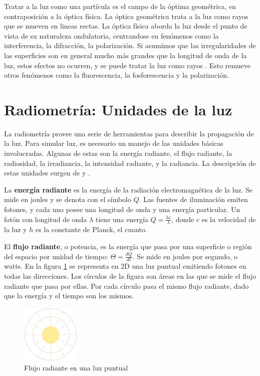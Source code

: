 Tratar a la luz como una partícula es el campo de la óptima geométrica, en contraposición a la óptica física.
La óptica geométrica trata a la luz como rayos que se mueven en lineas rectas.
La óptica física aborda la luz desde el punto de vista de su naturaleza ondulatoria, centrandose en fenómenos como la interferencia, la difracción, la polarización.
Si asumimos que las irregularidades de las superficies son en general mucho más grandes que la longitud de onda de la luz, estos efectos no ocurren, y se puede tratar la luz como rayos \cite{rtr}.
Esto remueve otros fenómenos como la fluorescencia, la fosforescencia y la polarización.


\section{Radiometría: Unidades de la luz}\label{sec:radiometry}

La radiometría provee una serie de herramientas para describir la propagación de la luz.
Para simular luz, es necesario un manejo de las unidades básicas involucradas.
Algunas de estas son la energía radiante, el flujo radiante, la radiosidad, la irradiancia, la intensidad radiante, y la radiancia.
La descripción de estas unidades surgen de \cite{rtr} y \cite{pbr}.

La \textbf{energía radiante} es la energía de la radiación electromagnética de la luz.
Se mide en joules y se denota con el símbolo $Q$.
Las fuentes de iluminación emiten fotones, y cada uno posee una longitud de onda y una energía particular.
Un fotón con longitud de onda $\lambda$ tiene una energía $Q = \frac{hc}{\lambda}$, donde $c$ es la velocidad de la luz y $h$ es la constante de Planck, el cuanto.

El \textbf{flujo radiante}, o potencia, es la energía que pasa por una superficie o región del espacio por unidad de tiempo: $\Theta = \frac{dQ}{dt}$.
Se mide en joules por segundo, o watts.
En la figura \ref{fig:point-light-flux} se representa en 2D una luz puntual emitiendo fotones en todas las direcciones.
Los círculos de la figura son áreas en las que se mide el flujo radiante que pasa por ellas.
Por cada círculo pasa el mismo flujo radiante, dado que la energía y el tiempo son los mismos.

\begin{figure}[ht]
    \centering
    \includegraphics[width=0.25\textwidth]{point-light-flux.png}
    \caption{Flujo radiante en una luz puntual}
    \label{fig:point-light-flux}
\end{figure}

